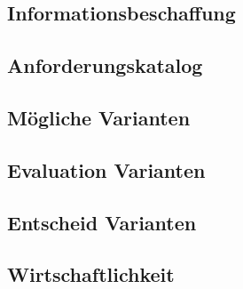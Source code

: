 \subsection{Informationsbeschaffung}



\clearpage
\subsection{Anforderungskatalog}



\subsection{Mögliche Varianten}

\subsection{Evaluation Varianten}

\subsection{Entscheid Varianten}

\subsection{Wirtschaftlichkeit}
